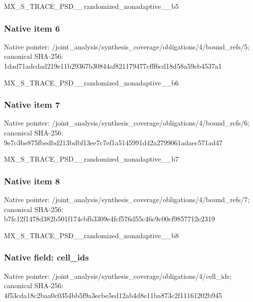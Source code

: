\documentclass[10pt,a4paper]{article}
\begin{document}
\begingroup\raggedright\sloppy MX\_\allowbreak{}S\_\allowbreak{}TRACE\_\allowbreak{}PSD\_\allowbreak{}\_\allowbreak{}randomized\_\allowbreak{}nonadaptive\_\allowbreak{}\_\allowbreak{}b5\par\endgroup

\subsubsection{Native item 6}
Native pointer: /joint\_\allowbreak{}analysis/synthesis\_\allowbreak{}coverage/obligations/4/bound\_\allowbreak{}refs/5; canonical SHA-256: 1dad71adcdad219e11b29367b30844af821179477cfff6cd18d58a59eb4537a1

\begingroup\raggedright\sloppy MX\_\allowbreak{}S\_\allowbreak{}TRACE\_\allowbreak{}PSD\_\allowbreak{}\_\allowbreak{}randomized\_\allowbreak{}nonadaptive\_\allowbreak{}\_\allowbreak{}b6\par\endgroup

\subsubsection{Native item 7}
Native pointer: /joint\_\allowbreak{}analysis/synthesis\_\allowbreak{}coverage/obligations/4/bound\_\allowbreak{}refs/6; canonical SHA-256: 9e7c3be875fbedbd213bdbf13ee7c7ef1a5145991d42a2799061adaec571ad47

\begingroup\raggedright\sloppy MX\_\allowbreak{}S\_\allowbreak{}TRACE\_\allowbreak{}PSD\_\allowbreak{}\_\allowbreak{}randomized\_\allowbreak{}nonadaptive\_\allowbreak{}\_\allowbreak{}b7\par\endgroup

\subsubsection{Native item 8}
Native pointer: /joint\_\allowbreak{}analysis/synthesis\_\allowbreak{}coverage/obligations/4/bound\_\allowbreak{}refs/7; canonical SHA-256: b7fc12f1478d382b501f174cbfb3309e4fcf576d55c46c9c00cf9857712e2319

\begingroup\raggedright\sloppy MX\_\allowbreak{}S\_\allowbreak{}TRACE\_\allowbreak{}PSD\_\allowbreak{}\_\allowbreak{}randomized\_\allowbreak{}nonadaptive\_\allowbreak{}\_\allowbreak{}b8\par\endgroup

\subsubsection{Native field: cell\_\allowbreak{}ids}
Native pointer: /joint\_\allowbreak{}analysis/synthesis\_\allowbreak{}coverage/obligations/4/cell\_\allowbreak{}ids; canonical SHA-256: 4f53cda18c2baa0c0354bb5f9a3ecbe5ed12ab4d8e11ba873c2f11161202b945
\end{document}
